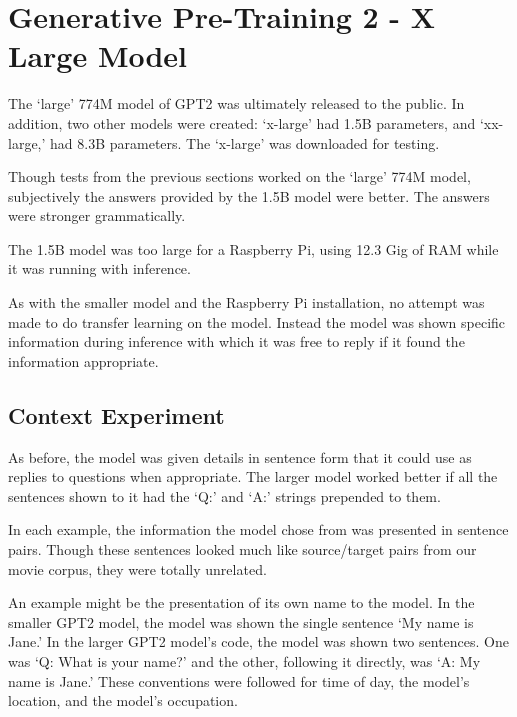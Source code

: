
\section{Generative Pre-Training 2 - X Large Model}

The `large' 774M model of GPT2 was ultimately released to the public. In addition, two other models were created: `x-large' had 1.5B parameters, and `xx-large,' had 8.3B parameters. The `x-large' was downloaded for testing.

Though tests from the previous sections worked on the `large' 774M model, subjectively the answers provided by the 1.5B model were better. The answers were stronger grammatically.

The 1.5B model was too large for a Raspberry Pi, using 12.3 Gig of RAM while it was running with inference. %

As with the smaller model and the Raspberry Pi installation, no attempt was made to do transfer learning on the model. Instead the model was shown specific information during inference with which it was free to reply if it found the information appropriate.


\label{chapter-gpt2-xl-intro}

\subsection{Context Experiment}

As before, the model was given details in sentence form that it could use as replies to questions when appropriate. The larger model worked better if all the sentences shown to it had the `Q:' and `A:' strings prepended to them. 

In each example, the information the model chose from was presented in sentence pairs. Though these sentences looked much like source/target pairs from our movie corpus, they were totally unrelated.

An example might be the presentation of its own name to the model. In the smaller GPT2 model, the model was shown the single sentence `My name is Jane.' In the larger GPT2 model's code, the model was shown two sentences. One was `Q: What is your name?' and the other, following it directly, was `A: My name is Jane.' These conventions were followed for time of day, the model's location, and the model's occupation.

